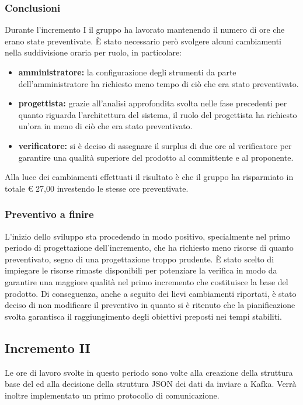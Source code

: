 		\subsubsection{Conclusioni}
			Durante l'incremento I il gruppo ha lavorato mantenendo il numero di ore che erano state preventivate. È stato necessario però svolgere alcuni cambiamenti nella suddivisione oraria per ruolo, in particolare:
			\begin{itemize}
				\item \textbf{amministratore:} la configurazione degli strumenti da parte dell'amministratore ha richiesto meno tempo di ciò che era stato preventivato.
				\item \textbf{progettista:} grazie all'analisi approfondita svolta nelle fase precedenti per quanto riguarda l'architettura del sistema, il ruolo del progettista ha richiesto un'ora in meno di ciò che era stato preventivato.
				\item \textbf{verificatore:} si è deciso di assegnare il surplus di due ore al verificatore per garantire una qualità superiore del prodotto al committente e al proponente.
			\end{itemize}
			Alla luce dei cambiamenti effettuati il risultato è che il gruppo ha risparmiato in totale € 27,00 investendo le stesse ore preventivate.
			\pagebreak
		
		\subsubsection{Preventivo a finire}
			L'inizio dello sviluppo sta procedendo in modo positivo, specialmente nel primo periodo di progettazione dell'incremento, che ha richiesto meno risorse di quanto preventivato, segno di una progettazione troppo prudente.
			\newline
			È stato scelto di impiegare le risorse rimaste disponibili per potenziare la verifica in modo da garantire una maggiore qualità nel primo incremento che costituisce la base del prodotto.
			\newline
			Di conseguenza, anche a seguito dei lievi cambiamenti riportati, è stato deciso di non modificare il preventivo in quanto si è ritenuto che la pianificazione svolta garantisca il raggiungimento degli obiettivi preposti nei tempi stabiliti.	

		\subsection{Incremento II }
		Le ore di lavoro svolte in questo periodo sono volte alla creazione della struttura base del  ed alla decisione della struttura JSON dei dati da inviare a Kafka. Verrà inoltre implementato un primo protocollo di comunicazione.
